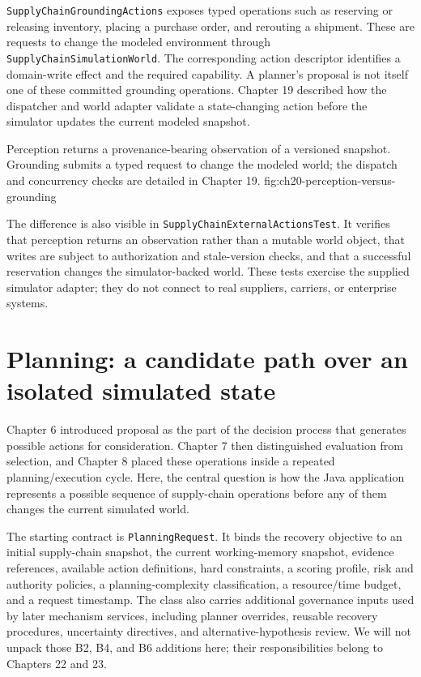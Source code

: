 \texttt{SupplyChainGroundingActions} exposes typed operations such as reserving or releasing inventory, placing a purchase order, and rerouting a shipment. These are requests to change the modeled environment through \texttt{SupplyChainSimulationWorld}. The corresponding action descriptor identifies a domain-write effect and the required capability. A planner's proposal is not itself one of these committed grounding operations. Chapter 19 described how the dispatcher and world adapter validate a state-changing action before the simulator updates the current modeled snapshot.

  {Perception returns a provenance-bearing observation of a versioned snapshot. Grounding submits a typed request to change the modeled world; the dispatch and concurrency checks are detailed in Chapter 19.}
  {fig:ch20-perception-versus-grounding}

The difference is also visible in \texttt{SupplyChainExternal\allowbreak ActionsTest}. It verifies that perception returns an observation rather than a mutable world object, that writes are subject to authorization and stale-version checks, and that a successful reservation changes the simulator-backed world. These tests exercise the supplied simulator adapter; they do not connect to real suppliers, carriers, or enterprise systems.

\section{Planning: a candidate path over an isolated simulated state}
\label{sec:ch20-planning}

Chapter 6 introduced proposal as the part of the decision process that generates possible actions for consideration. Chapter 7 then distinguished evaluation from selection, and Chapter 8 placed these operations inside a repeated planning/execution cycle. Here, the central question is how the Java application represents a possible sequence of supply-chain operations before any of them changes the current simulated world.

The starting contract is \texttt{PlanningRequest}. It binds the recovery objective to an initial supply-chain snapshot, the current working-memory snapshot, evidence references, available action definitions, hard constraints, a scoring profile, risk and authority policies, a planning-complexity classification, a resource/time budget, and a request timestamp. The class also carries additional governance inputs used by later mechanism services, including planner overrides, reusable recovery procedures, uncertainty directives, and alternative-hypothesis review. We will not unpack those B2, B4, and B6 additions here; their responsibilities belong to Chapters 22 and 23.

